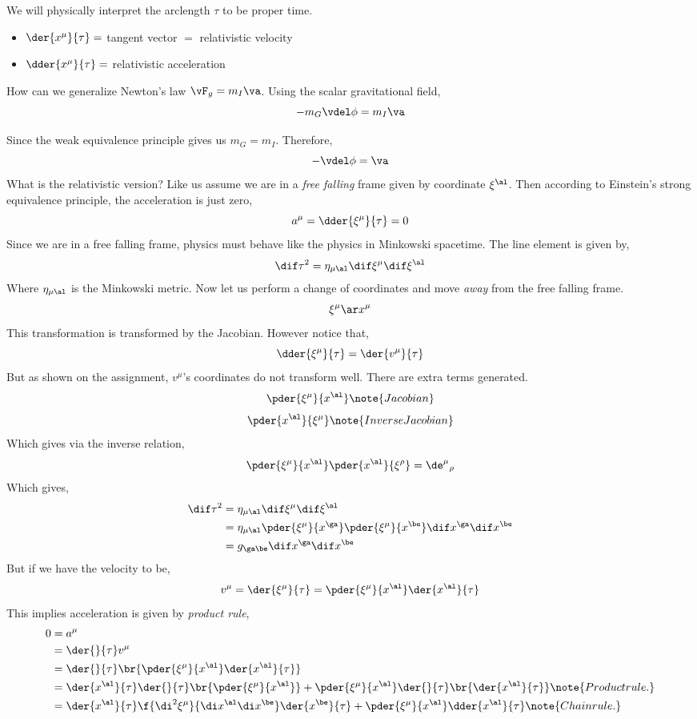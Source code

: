 \documentclass{article}
\begin{document}
We will physically interpret the arclength $\tau$ to be proper time.
\begin{itemize}
    \item $\der{x^\mu}{\tau} = $ tangent vector $=$ relativistic velocity
    \item $\dder{x^\mu}{\tau} = $ relativistic acceleration
\end{itemize}

How can we generalize Newton's law $\vF_g = m_I \va$. Using the scalar gravitational field,
\[ - m_G \vdel \phi = m_I \va \]

Since the weak equivalence principle gives us $m_G = m_I$. Therefore,
\[ - \vdel \phi = \va \]
What is the relativistic version? Like us assume we are in a \textit{free falling} frame given by coordinate $\xi^\al$. Then according to Einstein's strong equivalence principle, the acceleration is just zero,
\[ a^\mu = \dder{\xi^\mu}{\tau} = 0 \]
Since we are in a free falling frame, physics must behave like the physics in Minkowski spacetime. The line element is given by,
\[ \dif \tau ^2 = \eta_{\mu\al} \dif \xi^\mu \dif \xi^\al \]
Where $\eta_{\mu\al}$ is the Minkowski metric. Now let us perform a change of coordinates and move \textit{away} from the free falling frame.
\[ \xi^\mu \ar x^\mu \]
This transformation is transformed by the Jacobian. However notice that,
\[ \dder{\xi^\mu}{\tau} = \der{v^\mu}{\tau} \]
But as shown on the assignment, $v^\mu$'s coordinates do not transform well. There are extra terms generated.
\[ \pder{\xi^\mu}{x^\al} \note{Jacobian} \]
\[ \pder{x^\al}{\xi^\mu} \note{Inverse Jacobian} \]
Which gives via the inverse relation,
\[ \pder{\xi^\mu}{x^\al}\pder{x^\al}{\xi^\rho} = {\de^\mu}_\rho \]
Which gives,
\begin{align*}
    \dif \tau^2 &= \eta_{\mu\al} \dif \xi^\mu \dif \xi^\al \\
    &= \eta_{\mu\al} \pder{\xi^\mu}{x^\ga}\pder{\xi^\mu}{x^\be}\dif x^\ga \dif x^\be \\
    &= g_{\ga\be}\dif x^\ga \dif x^\be
\end{align*}
But if we have the velocity to be,
\[ v^\mu = \der{\xi^\mu}{\tau} = \pder{\xi^\mu}{x^\al} \der{x^\al}{\tau} \]
This implies acceleration is given by \textit{product rule},
\begin{align*}
0 &= a^\mu  \\
&= \der{}{\tau} v^\mu \\
&= \der{}{\tau} \br{\pder{\xi^\mu}{x^\al} \der{x^\al}{\tau}} \\
&= \der{x^\al}{\tau}\der{}{\tau} \br{\pder{\xi^\mu}{x^\al} } + \pder{\xi^\mu}{x^\al}\der{}{\tau} \br{ \der{x^\al}{\tau}} \note{Product rule.}\\
&= \der{x^\al}{\tau} \f{\di^2\xi^\mu}{\di x^\al\di x^\be}\der{x^\be}{\tau} + \pder{\xi^\mu}{x^\al}\dder{x^\al}{\tau} \note{Chain rule.}\\
\end{align*}
\end{document}
